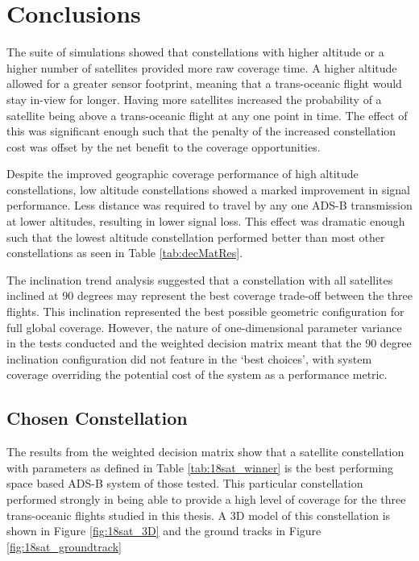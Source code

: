 \section{Conclusions}
The suite of simulations showed that constellations with higher altitude or a higher number of satellites provided more raw coverage time. A higher altitude allowed for a greater sensor footprint, meaning that a trans-oceanic flight would stay in-view for longer. Having more satellites increased the probability of a satellite being above a trans-oceanic flight at any one point in time. The effect of this was significant enough such that the penalty of the increased constellation cost was offset by the net benefit to the coverage opportunities.

Despite the improved geographic coverage performance of high altitude constellations, low altitude constellations showed a marked improvement in signal performance. Less distance was required to travel by any one ADS-B transmission at lower altitudes, resulting in lower signal loss. This effect was dramatic enough such that the lowest altitude constellation performed better than most other constellations as seen in Table \ref{tab:decMatRes}.

The inclination trend analysis suggested that a constellation with all satellites inclined at 90 degrees may represent the best coverage trade-off between the three flights. This inclination represented the best possible geometric configuration for full global coverage. However, the nature of one-dimensional parameter variance in the tests conducted and the weighted decision matrix meant that the 90 degree inclination configuration did not feature in the `best choices', with system coverage overriding the potential cost of the system as a performance metric. 
\subsection{Chosen Constellation}
The results from the weighted decision matrix show that a satellite constellation with parameters as defined in Table \ref{tab:18sat_winner} is the best performing space based ADS-B system of those tested. This particular constellation performed strongly in being able to provide a high level of coverage for the three trans-oceanic flights studied in this thesis. A 3D model of this constellation is shown in Figure \ref{fig:18sat_3D} and the ground tracks in Figure \ref{fig:18sat_groundtrack}

